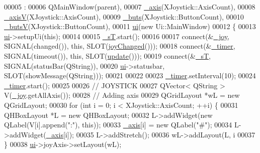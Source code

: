\begin{DoxyCode}
00005                                       :
00006     QMainWindow(parent),
00007     \hyperlink{a00004_a30c99d7a544f74b0650758e5cc7ead5a}{\_axis}(XJoystick::AxisCount),
00008     \hyperlink{a00004_a20f66f574ed4c96d8dfc0013e1095f15}{\_axisV}(XJoystick::AxisCount),
00009     \hyperlink{a00004_a8eaf474e1b8672f32873ed009e28ce8a}{\_buts}(XJoystick::ButtonCount),
00010     \hyperlink{a00004_a519ae4630572cb63fbd04bce12fe8e77}{\_butsV}(XJoystick::ButtonCount),
00011     \hyperlink{a00004_a35466a70ed47252a0191168126a352a5}{ui}(\textcolor{keyword}{new} Ui::MainWindow)
00012 \{
00013     \hyperlink{a00004_a35466a70ed47252a0191168126a352a5}{ui}->setupUi(\textcolor{keyword}{this});
00014     
00015     \hyperlink{a00004_a97f8ecc7ecb930b796178cef7b975013}{\_sT}.start();
00016     
00017     connect(&\hyperlink{a00004_a671f35800890e518713e1946671d8730}{\_joy}, SIGNAL(changed()), \textcolor{keyword}{this}, SLOT(\hyperlink{a00004_abb4c2d8a79c9f80010ea031366bf8226}{joyChanged}()));
00018     connect(&\hyperlink{a00004_a254b03b878cfda75c1c411a2f8568d33}{\_timer}, SIGNAL(timeout()), \textcolor{keyword}{this}, SLOT(\hyperlink{a00004_a128f71880d4b9683149023fc46fcc9f8}{update}()));
00019     connect(&\hyperlink{a00004_a97f8ecc7ecb930b796178cef7b975013}{\_sT}, SIGNAL(statusBar(QString)), 
00020             \hyperlink{a00004_a35466a70ed47252a0191168126a352a5}{ui}->statusbar, SLOT(showMessage(QString)));
00021     
00022     
00023     \hyperlink{a00004_a254b03b878cfda75c1c411a2f8568d33}{\_timer}.setInterval(10);
00024     \hyperlink{a00004_a254b03b878cfda75c1c411a2f8568d33}{\_timer}.start();
00025     
00026     \textcolor{comment}{// JOYSTICK}
00027     QVector< QString > V(\hyperlink{a00004_a671f35800890e518713e1946671d8730}{\_joy}.getAllAxis());
00028     \textcolor{comment}{// Adding axis}
00029     QGridLayout *wL = \textcolor{keyword}{new} QGridLayout;
00030     \textcolor{keywordflow}{for} (\textcolor{keywordtype}{int} i = 0; i < XJoystick::AxisCount; ++i) \{
00031         QHBoxLayout *L = \textcolor{keyword}{new} QHBoxLayout;
00032         L->addWidget(\textcolor{keyword}{new} QLabel(V[i].append(\textcolor{stringliteral}{":"}), \textcolor{keyword}{this}));
00033         \hyperlink{a00004_a30c99d7a544f74b0650758e5cc7ead5a}{\_axis}[i] = \textcolor{keyword}{new} QLabel(\textcolor{stringliteral}{"#"});
00034         L->addWidget(\hyperlink{a00004_a30c99d7a544f74b0650758e5cc7ead5a}{\_axis}[i]);
00035         L->addStretch();
00036         wL->addLayout(L, i%
00037     \}
00038     \hyperlink{a00004_a35466a70ed47252a0191168126a352a5}{ui}->joyAxis->setLayout(wL);

\end{DoxyCode}
